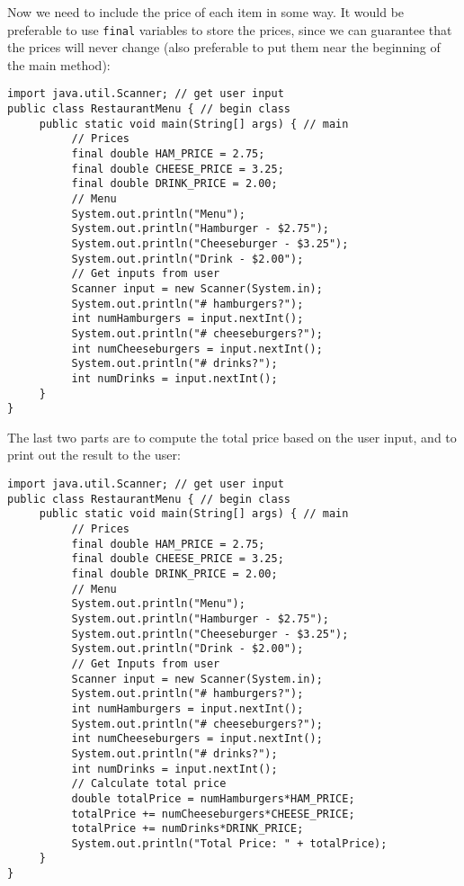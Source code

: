 \noindent Now we need to include the price of each item in some way. It would be preferable to use \verb|final| variables to store the prices, since we can guarantee that the prices will never change (also preferable to put them near the beginning of the main method):
\begin{lstlisting}
import java.util.Scanner; // get user input
public class RestaurantMenu { // begin class
     public static void main(String[] args) { // main
          // Prices
          final double HAM_PRICE = 2.75;
          final double CHEESE_PRICE = 3.25;
          final double DRINK_PRICE = 2.00;
          // Menu
          System.out.println("Menu");
          System.out.println("Hamburger - $2.75");
          System.out.println("Cheeseburger - $3.25");
          System.out.println("Drink - $2.00");
          // Get inputs from user
          Scanner input = new Scanner(System.in);
          System.out.println("# hamburgers?");
          int numHamburgers = input.nextInt();
          System.out.println("# cheeseburgers?");
          int numCheeseburgers = input.nextInt();
          System.out.println("# drinks?");
          int numDrinks = input.nextInt();
     }
}
\end{lstlisting}

\noindent The last two parts are to compute the total price based on the user input, and to print out the result to the user:
\begin{lstlisting}
import java.util.Scanner; // get user input
public class RestaurantMenu { // begin class
     public static void main(String[] args) { // main
          // Prices
          final double HAM_PRICE = 2.75;
          final double CHEESE_PRICE = 3.25;
          final double DRINK_PRICE = 2.00;
          // Menu
          System.out.println("Menu");
          System.out.println("Hamburger - $2.75");
          System.out.println("Cheeseburger - $3.25");
          System.out.println("Drink - $2.00");
          // Get Inputs from user
          Scanner input = new Scanner(System.in);
          System.out.println("# hamburgers?");
          int numHamburgers = input.nextInt();
          System.out.println("# cheeseburgers?");
          int numCheeseburgers = input.nextInt();
          System.out.println("# drinks?");
          int numDrinks = input.nextInt();
          // Calculate total price
          double totalPrice = numHamburgers*HAM_PRICE;
          totalPrice += numCheeseburgers*CHEESE_PRICE;
          totalPrice += numDrinks*DRINK_PRICE;
          System.out.println("Total Price: " + totalPrice);
     }
}
\end{lstlisting}

